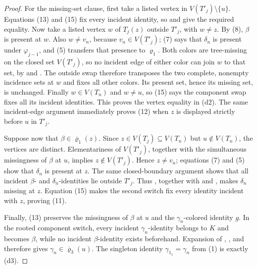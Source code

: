 \begin{proof}
For the missing-set clause, first take a listed vertex in
\(V(T'_j)\setminus\{u\}\).  Equations (13) and (15) fix every incident
identity, so  and  give the
required equality.  Now take a listed vertex \(w\) of \(T_j(z)\) outside
\(T'_j\), with \(w\ne z\).  By (8), \(\beta\) is present at \(w\).
Also \(w\ne v_n\), because \(v_n\in V(T'_j)\); (7) says that
\(\delta_n\) is present under \(\varphi_{j-1}\), and (5) transfers that
presence to \(\varrho_1\).  Both colors are tree-missing on the closed
set \(V(T'_j)\), so no incident edge of either color can join \(w\) to
that set, by  and
.  The outside swap therefore transposes
the two complete, nonempty incidence sets at \(w\) and fixes all other
colors.  Its present set, hence its missing set, is unchanged.  Finally
\(w\in V(T_n)\) and \(w\ne u\), so (15) says the component swap fixes all
its incident identities.  This proves the vertex equality in (d2).
The same incident-edge argument immediately proves (12) when
\(z\) is displayed strictly before \(u\) in \(T'_j\).

Suppose now that \(\beta\in\overline{\varrho}_1(z)\).  Since
\(z\in V(T_j)\subseteq V(T_n)\) but \(u\notin V(T_n)\), the vertices are
distinct.  Elementariness of \(V(T'_j)\), together with the simultaneous
missingness of \(\beta\) at \(u\), implies \(z\notin V(T'_j)\).  Hence
\(z\ne v_n\); equations (7) and (5) show that \(\delta_n\) is present at
\(z\).  The same closed-boundary argument shows that all incident
\(\beta\)- and \(\delta_n\)-identities lie outside \(T'_j\).  Thus
, together with
 and , makes
\(\delta_n\) missing at \(z\).  Equation (15) makes the second switch
fix every identity incident with \(z\), proving (11).

Finally, (13) preserves the missingness of \(\beta\) at \(u\) and the
\(\gamma_n\)-colored identity \(g\).  In the rooted component switch,
every incident \(\gamma_n\)-identity belongs to \(K\) and becomes
\(\beta\), while no incident \(\beta\)-identity exists beforehand.
Expansion of ,
, and  therefore gives
\(\gamma_n\in\overline{\varrho}_3(u)\).  The singleton identity
\(\gamma_{1_1}=\gamma_n\) from (1) is exactly (d3).
\end{proof}

